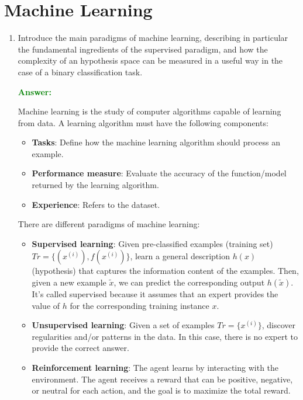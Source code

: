 \documentclass[12pt]{article}
\begin{document}
\section{Machine Learning}
\begin{enumerate}[label=\textbf{ML.\arabic*}]
    \item Introduce the main paradigms of machine learning, describing in particular the fundamental ingredients of the supervised paradigm, and how the complexity of an hypothesis space can be measured in a useful way in the case of a binary classification task.

          \textcolor{green}{\textbf{Answer:}}

          Machine learning is the study of computer algorithms capable of learning from data. A learning algorithm must have the following components:
          \begin{itemize}
              \item \textbf{Tasks}: Define how the machine learning algorithm should process an example.
              \item \textbf{Performance measure}: Evaluate the accuracy of the function/model returned by the learning algorithm.
              \item \textbf{Experience}: Refers to the dataset.
          \end{itemize}

          There are different paradigms of machine learning:
          \begin{itemize}
              \item \textbf{Supervised learning}\label{q:ml-paradigms}: Given pre-classified examples (training set) $Tr = \{(x^{(i)}),f(x^{(i)})\}$, learn a general description $h(x)$ (hypothesis) that captures the information content of the examples. Then, given a new example $\tilde{x}$, we can predict the corresponding output $h(\tilde{x})$. It's called supervised because it assumes that an expert provides the value of $h$ for the corresponding training instance $x$.
              \item \textbf{Unsupervised learning}: Given a set of examples $Tr = \{x^{(i)}\}$, discover regularities and/or patterns in the data. In this case, there is no expert to provide the correct answer.
              \item \textbf{Reinforcement learning}: The agent learns by interacting with the environment. The agent receives a reward that can be positive, negative, or neutral for each action, and the goal is to maximize the total reward.
          \end{itemize}


\end{enumerate}
\end{document}
